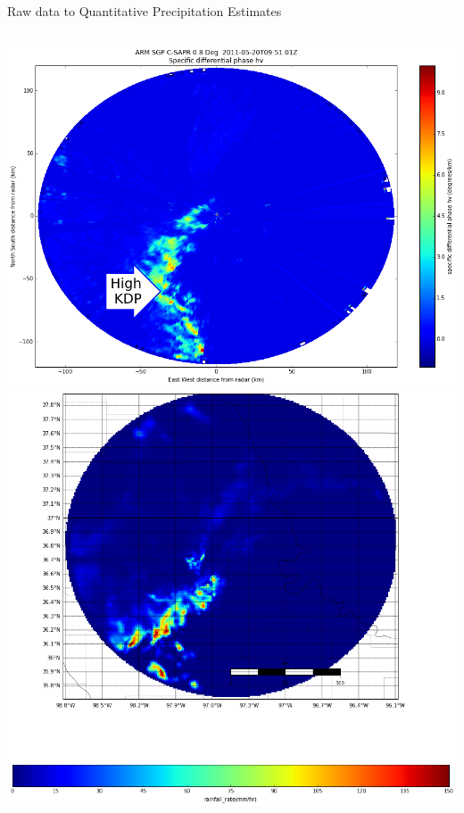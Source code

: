 \documentclass[final]{beamer}
\begin{document}
\begin{frame}{}
\begin{columns}[t]
\begin{column}{.3\linewidth}
\begin{block}{Raw data to Quantitative Precipitation Estimates}
\begin{columns}[t]
\begin{column}{.6\linewidth}
\begin{columns}[t]
\begin{column}{.5\linewidth}
           		\includegraphics[width=.95\linewidth]{figures/kdp.png}\\[1ex]    %
			\includegraphics[width=.95\linewidth]{figures/qpe.png}\\[1ex]  
		

\end{column}
\end{columns}
\end{column}
\end{columns}
\end{block}
\end{column}
\end{columns}
\end{frame}
\end{document}
